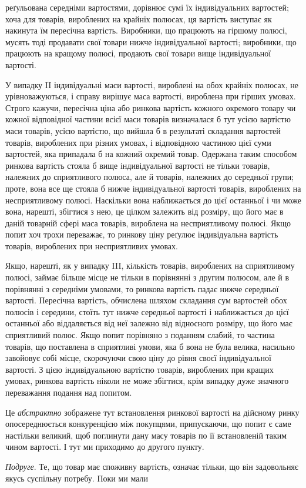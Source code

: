 \enlargethispage{\baselineskip}
\parcont{}  %
реґульована середніми вартостями, дорівнює сумі їх індивідуальних вартостей; хоча для товарів,
вироблених на крайніх полюсах, ця вартість виступає як накинута їм пересічна вартість. Виробники, що
працюють на гіршому полюсі, мусять тоді продавати свої товари нижче індивідуальної вартості;
виробники,
що працюють на кращому полюсі, продають свої товари вище
індивідуальної вартості.

У випадку II індивідуальні маси вартості, вироблені на обох
крайніх полюсах, не урівноважуються, і справу вирішує маса
вартості, вироблена при гірших умовах. Строго кажучи, пересічна ціна або ринкова вартість кожного
окремого товару чи
кожної відповідної частини всієї маси товарів визначалася б тут
усією вартістю маси товарів, усією вартістю, що вийшла б
в результаті складання вартостей товарів, вироблених при різних умовах, і відповідною частиною цієї
суми вартостей, яка
припадала б на кожний окремий товар. Одержана таким способом ринкова вартість стояла б вище
індивідуальної вартості
не тільки товарів, належних до сприятливого полюса, але й товарів, належних до середньої групи;
проте, вона все ще стояла б
нижче індивідуальної вартості товарів, вироблених на несприятливому полюсі. Наскільки вона
наближається до цієї останньої
і чи може вона, нарешті, збігтися з нею, це цілком залежить від
розміру, що його має в даній товарній сфері маса товарів,
вироблена на несприятливому полюсі. Якщо попит хоч трохи
переважає, то ринкову ціну реґулює індивідуальна вартість товарів, вироблених при несприятливих
умовах.

Якщо, нарешті, як у випадку III, кількість товарів, вироблених на сприятливому полюсі, займає більше
місце не тільки
в порівнянні з другим полюсом, але й в порівнянні з середніми
умовами, то ринкова вартість падає нижче середньої вартості.
Пересічна вартість, обчислена шляхом складання сум вартостей
обох полюсів і середини, стоїть тут нижче середньої вартості
і наближається до цієї останньої або віддаляється від неї
залежно від відносного розміру, що його має сприятливий полюс.
Якщо попит порівняно з поданням слабий, то частина товарів,
що поставлена в сприятливі умови, яка б вона не була велика,
насильно завойовує собі місце, скорочуючи свою ціну до рівня
своєї індивідуальної вартості. З цією індивідуальною вартістю
товарів, вироблених при кращих умовах, ринкова вартість ніколи
не може збігтися, крім випадку дуже значного переважання подання над попитом.

Це \emph{абстрактно} зображене тут встановлення ринкової вартості на дійсному ринку опосереднюється
конкуренцією між
покупцями, припускаючи, що попит є саме настільки великий,
щоб поглинути дану масу товарів по її встановленій таким
чином вартості. І тут ми приходимо до другого пункту.

\emph{Подруге}. Те, що товар має споживну вартість, означає тільки,
що він задовольняє якусь суспільну потребу. Поки ми мали
\parbreak{}  %

